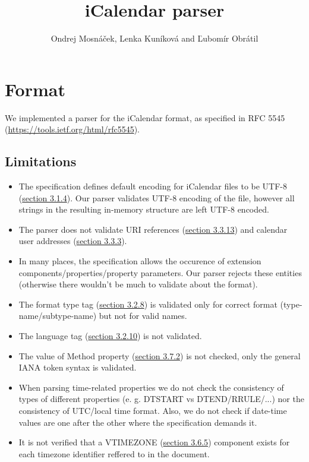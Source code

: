 \documentclass[10pt,a4paper]{article}
\author{Ondrej Mosnáček, Lenka Kuníková and Ľubomír Obrátil}
\title{iCalendar parser}
\begin{document}
\maketitle

\section*{Format}
We implemented a parser for the iCalendar format, as specified in RFC 5545 (\url{https://tools.ietf.org/html/rfc5545}).
\subsection*{Limitations}
\begin{itemize}
	\item The specification defines default encoding for iCalendar files to be UTF-8 (\hyperref{https://tools.ietf.org/html/rfc5545\#section-3.1.4}{}{}{section 3.1.4}). Our parser validates UTF-8 encoding of the file, however all strings in the resulting in-memory structure are left UTF-8 encoded.
	\item The parser does not validate URI references (\hyperref{https://tools.ietf.org/html/rfc5545\#section-3.3.13}{}{}{section 3.3.13}) and calendar user addresses (\hyperref{https://tools.ietf.org/html/rfc5545\#section-3.3.3}{}{}{section 3.3.3}).
	\item In many places, the specification allows the occurence of extension components/properties/property parameters. Our parser rejects these entities (otherwise there wouldn't be much to validate about the format).
	\item The format type tag (\hyperref{https://tools.ietf.org/html/rfc5545\#section-3.2.8}{}{}{section 3.2.8}) is validated only for correct format (type-name/subtype-name) but not for valid names.
	\item The language tag (\hyperref{https://tools.ietf.org/html/rfc5545\#section-3.2.10}{}{}{section 3.2.10}) is not validated.
	\item The value of Method property (\hyperref{https://tools.ietf.org/html/rfc5545\#section-3.7.2}{}{}{section 3.7.2}) is not checked, only the general IANA token syntax is validated.
	\item When parsing time-related properties we do not check the consistency of types of different properties (e. g. DTSTART vs DTEND/RRULE/...) nor the consistency of UTC/local time format. Also, we do not check if date-time values are one after the other where the specification demands it.
	\item It is not verified that a VTIMEZONE (\hyperref{https://tools.ietf.org/html/rfc5545\#section-3.6.5}{}{}{section 3.6.5}) component exists for each timezone identifier reffered to in the document.

\end{itemize}
\end{document}
